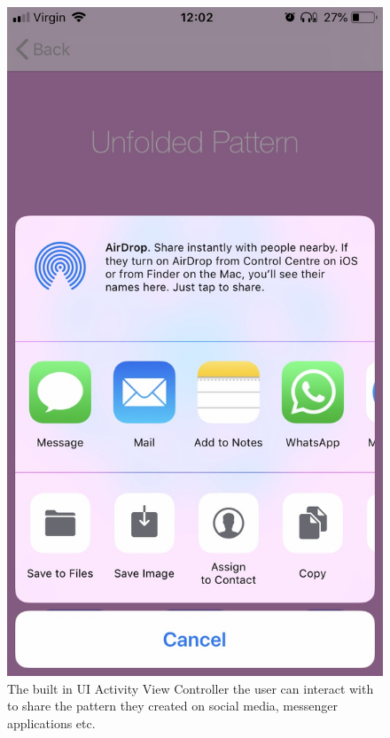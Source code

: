 \documentclass[11pt]{article}
\begin{document}
            \begin{figure}[!ht]
                        \begin{minipage}{0.45\textwidth}
                            \centering \includegraphics[width=0.7\linewidth]{KiriZen/share.jpeg}
                            \caption{The built in UI Activity View Controller the user can interact with to share the pattern they created on social media, messenger applications etc.}
                            \label{fig:kiriZen-share}
                        \end{minipage}\hfill
                        \begin{minipage}{0.45\textwidth}
                            \centering

\end{minipage}
\end{figure}
\end{document}
